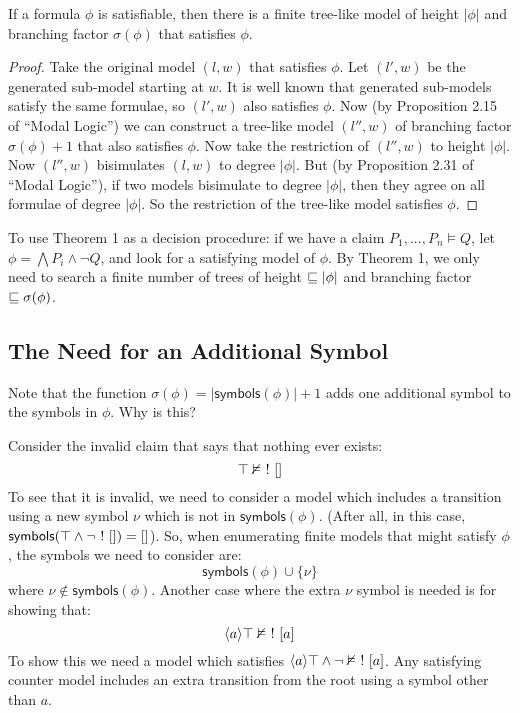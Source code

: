\begin{theorem}
If a formula $\phi$ is satisfiable, then there is a finite tree-like model of height $|\phi|$ and branching factor $\sigma(\phi)$ that satisfies $\phi$.
\end{theorem}
\begin{proof}
Take the original  model $(l,w)$ that satisfies $\phi$.
Let $(l',w)$ be the generated sub-model starting at $w$. 
It is well known that generated sub-models satisfy the same formulae, so $(l',w)$ also satisfies $\phi$.
Now (by Proposition 2.15 of ``Modal Logic'') we can construct a tree-like model $(l'',w)$ of branching factor $\sigma(\phi)+1$ that also satisfies $\phi$.
Now take the restriction of $(l'',w)$ to height $|\phi|$.
Now $(l'',w)$ bisimulates $(l,w)$ to degree $|\phi|$.
But (by Proposition 2.31 of ``Modal Logic''), if two models bisimulate to degree $|\phi|$, then they agree on all formulae of degree $|\phi|$. So the restriction of the tree-like model satisfies $\phi$.
\end{proof}

To use Theorem 1 as a decision procedure: if we have a claim $P_1, ..., P_n \models Q$,  let $ \phi = \bigwedge P_i \land \neg Q$, and look for a satisfying model of $\phi$. By Theorem 1, we only need to search a finite number of trees of height $\sqsubseteq |\phi|$ and branching factor $\sqsubseteq \sigma(\phi)$.

\subsection{The Need for an Additional Symbol}
Note that the function $\sigma(\phi) = |\mathsf{symbols}(\phi)| + 1$ adds one additional symbol to the symbols in $\phi$. Why is this?

Consider the invalid claim that says that nothing ever exists:
\[
\top \nvDash \ ! \  []
\]
To see that it is invalid, we need to consider a model which includes a transition using a new symbol $\nu$ which is not in $\mathsf{symbols}(\phi)$. (After all, in this case, $\mathsf{symbols}(\top \land \neg  \ ! \  []) = []$). 
So, when enumerating finite models that might satisfy $\phi$, the symbols we need to consider are:
\[
\mathsf{symbols}(\phi) \cup \{\nu\}
\]
where $\nu \notin \mathsf{symbols}(\phi)$. Another case where the extra $\nu$ symbol is needed is for showing that:
\[
\langle a \rangle \top \nvDash \ ! \  [a]
\]
To show this we need a model which satisfies $\langle a \rangle \top \land \neg \nvDash \ ! \  [a]$.
Any satisfying counter model includes an extra transition from the root using a symbol other than $a$.

